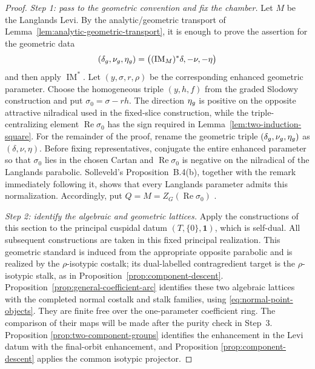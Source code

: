 \documentclass[10pt,a4paper]{amsart}
\begin{document}
\begin{proof}
\smallskip
\noindent\emph{Step 1: pass to the geometric convention and fix the chamber.}
Let $M$ be the Langlands Levi.  By the
analytic/geometric transport of
Lemma~\ref{lem:analytic-geometric-transport}, it is enough to prove
the assertion for the geometric data
\[
 (\delta_{\rm g},\nu_{\rm g},\eta_{\rm g})
 =\bigl((\operatorname{IM}_M)^*\delta,-\nu,-\eta\bigr)
\]
and then apply $\operatorname{IM}^*$.  Let
$(y,\sigma,r,\rho)$ be the corresponding enhanced geometric parameter.
Choose the homogeneous triple $(y,h,f)$ from the graded Slodowy construction
and put $\sigma_0=\sigma-rh$.  The direction $\eta_{\rm g}$ is positive on the
opposite attractive nilradical used in the fixed-slice construction, while
the triple-centralizing element $\operatorname{Re}\sigma_0$ has the sign
required in Lemma~\ref{lem:two-induction-square}.  For the remainder of the proof,
rename the geometric triple $(\delta_{\rm g},\nu_{\rm g},\eta_{\rm g})$ as
$(\delta,\nu,\eta)$.
Before fixing representatives, conjugate the entire enhanced parameter so
that $\sigma_0$ lies in the chosen Cartan and
$\operatorname{Re}\sigma_0$ is negative on the nilradical of the Langlands
parabolic.  Solleveld's Proposition~B.4(b), together with the remark
immediately following it, shows that every Langlands parameter admits this
normalization.  Accordingly, put
$Q=M=Z_G(\operatorname{Re}\sigma_0)$
\cite[Proposition~B.4(b) and the following remark]{Solleveld}.

\smallskip
\noindent\emph{Step 2: identify the algebraic and geometric lattices.}
Apply the constructions of this section to the principal cuspidal datum
$(T,\{0\},\mathbf1)$, which is self-dual.  All subsequent constructions are
taken in this fixed principal realization.
This geometric standard is induced from the appropriate opposite parabolic
and is realized by the $\rho$-isotypic costalk; its dual-labelled
contragredient target is the $\rho$-isotypic stalk, as in
Proposition~\ref{prop:component-descent}.
Proposition~\ref{prop:general-coefficient-arc}
identifies these two algebraic lattices with the completed normal
costalk and stalk families, using \eqref{eq:normal-point-objects}.
They are finite free over the one-parameter coefficient ring.  The
comparison of their maps will be made after the purity check in Step~3.  Proposition
\ref{prop:two-component-groups} identifies the enhancement in the Levi datum
with the final-orbit enhancement, and Proposition
\ref{prop:component-descent} applies the common isotypic projector.


\end{proof}
\end{document}
